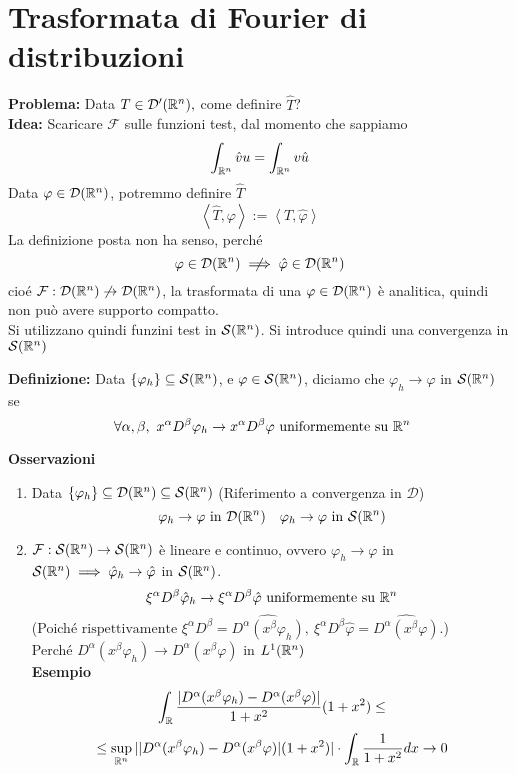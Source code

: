 
\section{Trasformata di Fourier di distribuzioni}
\textbf{Problema:} Data $T\in \mathcal D'(\mathbb{R}^n),$ come definire $\hat{T}$?
\\\textbf{Idea:} Scaricare $\mathcal F$ sulle funzioni test, dal momento che sappiamo 
\[\int_{\mathbb{R}^n}^{} \hat{v}u=\int_{\mathbb{R}^n}^{} v\hat{u}  \]
Data $\varphi \in \mathcal D(\mathbb{R}^n)$, potremmo definire $\hat{T}$ 
\[ \left< \hat{T},\varphi \right> := \left< T,\hat{\varphi} \right> \]
La definizione posta non ha senso, perché
\[\varphi \in \mathcal D(\R^n) \centernot\implies \hat{\varphi}\in \mathcal D(\R^n)\]
cioé $\mathcal F:\mathcal D(\mathbb{R}^n)\not \to \mathcal D(\mathbb{R}^n)$, la trasformata di una $\varphi \in \mathcal D(\mathbb{R}^n) $ è analitica, quindi non può avere supporto compatto.
\\Si utilizzano quindi funzini test in $\mathcal S(\mathbb{R}^n)$. Si introduce quindi una convergenza in $\mathcal S(\mathbb{R}^n)$
\begin{tcolorbox}
	\textbf{Definizione: }Data $\{\varphi_h\} \subseteq  \mathcal S(\mathbb{R}^n)$, e $\varphi \in \mathcal S(\mathbb{R}^n)$, diciamo che $\varphi_h\to \varphi$ in $\mathcal S(\mathbb{R}^n)$ se 
	\[\ \forall \alpha,\beta,\ x^\alpha D^\beta \varphi_h\to x^\alpha D^\beta \varphi\text{ uniformemente su }\mathbb{R}^n\]
\end{tcolorbox}
\textbf{Osservazioni} 
\begin{enumerate}
	\item Data $\{\varphi_h\} \subseteq  \mathcal D(\mathbb{R}^n)\subseteq  \mathcal S(\mathbb{R}^n)$ (Riferimento a convergenza in $\mathcal D$)
		\[\varphi_h\to \varphi\text{ in }\mathcal D(\mathbb{R}^n)\ \ \ \varphi_h\to \varphi\text{ in }\mathcal S(\mathbb{R}^n)\]
	\item $\mathcal F:\mathcal S(\mathbb{R}^n)\to \mathcal S(\mathbb{R}^n)$ è lineare e continuo, ovvero $\varphi_h\to \varphi$ in $\mathcal S(\mathbb{R}^n)\implies \hat{\varphi}_h\to \hat{\varphi}$ in $\mathcal S(\mathbb{R}^n)$.
		\[\xi^\alpha D^\beta \hat{\varphi}_h\to \xi ^\alpha D^\beta \hat{\varphi}\text{ uniformemente su }\mathbb{R}^n\]
		(Poiché $\text{rispettivamente } \xi^\alpha D^\beta =\widehat{D^\alpha (x^\beta \varphi_h)},\ \xi^\alpha D^\beta \hat{\varphi}=\widehat{D^\alpha (x^\beta \varphi)}.$)\\
	Perché $D^\alpha (x^\beta \varphi_h)\to D^\alpha (x^\beta \varphi)$ in $L^{1}(\mathbb{R}^n)$\\
	\textbf{Esempio} 
	\[\int_{\mathbb{R}}^{}  \frac{|D^\alpha(x^\beta\varphi_h)-D^\alpha (x^\beta \varphi)|}{1+x^2}(1+x^2)\le \]\[\le \sup_{\mathbb{R}^n} | |D^\alpha(x^\beta \varphi_h)-D^\alpha(x^\beta \varphi)|(1+x^2)|\cdot \int_{\mathbb{R}}^{}  \frac{1}{1+x^2}dx\to 0\] 

\end{enumerate}
